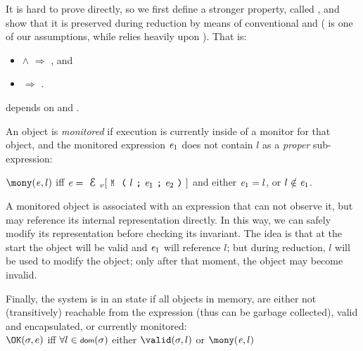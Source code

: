 It is hard to prove  directly,
so we first define a stronger property,
called , and
show that it is preserved during reduction by means of conventional
 and  ( is one of our assumptions,
while  relies heavily upon ).
That is:
\SSI\begin{itemize}
\item {} $\wedge$  $\Rightarrow$ , and
\item {} $\Rightarrow$ .
\end{itemize}


 depends on \mony and \OK. 

An object is \emph{monitored} if execution
is currently inside of a monitor for that object, and
the monitored expression ${\mathit{e}}_1$ does not
contain $l$ as a \emph{proper} sub-expression:

\indent $\mony(\e,l)$ iff
$\e=\ctx_v[\M{l}{\e_1}{\e_2}]$ and either ${\mathit{e}}_1=l$, or $l \notin {\ensuremath{\mathit{e}}}_1$.%

\noindent A monitored object is associated with an expression that can not observe it, but may
reference its internal representation directly.
In this way, we can safely modify its representation before checking its invariant.
The idea is that at the start the object will be valid and ${\mathit{e}}_1$ will reference $l$;
but during reduction, $l$ will be used to
modify the object; only after that moment, the object may become invalid.


Finally, the system is in an \OK state
if all objects in memory, are either
not (transitively) reachable from the expression (thus can be garbage collected),
valid and encapsulated,
or currently monitored:\\
\indent $\OK(\sigma,e)$ iff $\forall l\in\dom(\sigma)$
  either $\valid(\sigma,l)$ or $\mony(\e,l)$\\

